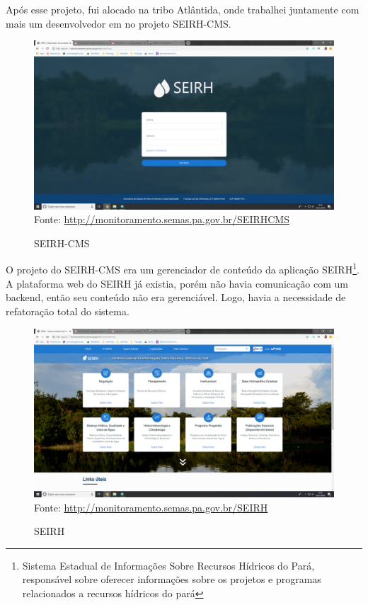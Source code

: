 Após esse projeto, fui alocado na tribo Atlântida, onde trabalhei juntamente com mais um desenvolvedor em no projeto SEIRH-CMS.

\begin{figure}[H]
\centering
\caption{SEIRH-CMS} %
\includegraphics[scale=0.22]{SEIRH-CMS}\\  %
{\small Fonte: \url{http://monitoramento.semas.pa.gov.br/SEIRHCMS}} %
\label{fig:exemplo} %
\end{figure}

O projeto do SEIRH-CMS era um gerenciador de conteúdo da aplicação SEIRH\footnote{Sistema Estadual de Informações Sobre Recursos Hídricos do Pará, responsável sobre oferecer informações sobre os projetos e programas relacionados a recursos hídricos do pará}.
A plataforma web do SEIRH já existia, porém não havia comunicação com um backend, então seu conteúdo não era gerenciável. Logo, havia a necessidade de refatoração total do sistema.

\begin{figure}[H]
\centering
\caption{SEIRH} %
\includegraphics[scale=0.22]{SEIRH}\\  %
{\small Fonte: \url{http://monitoramento.semas.pa.gov.br/SEIRH}} %
\label{fig:exemplo} %
\end{figure}

